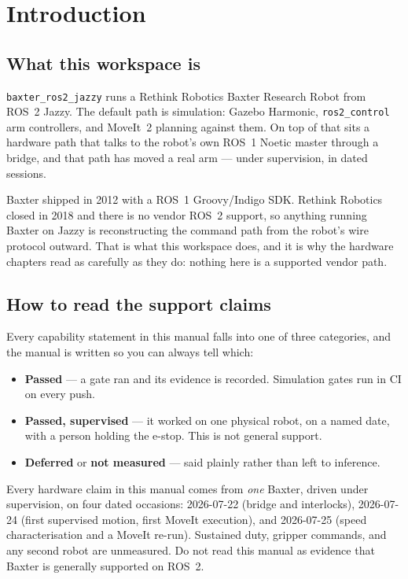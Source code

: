 \chapter{Introduction}
\label{ch:intro}

\section{What this workspace is}

\texttt{baxter\_ros2\_jazzy} runs a Rethink Robotics Baxter Research Robot from
ROS~2 Jazzy. The default path is simulation: Gazebo Harmonic, \texttt{ros2\_control}
arm controllers, and MoveIt~2 planning against them. On top of that sits a
hardware path that talks to the robot's own ROS~1 Noetic master through a bridge,
and that path has moved a real arm --- under supervision, in dated sessions.

Baxter shipped in 2012 with a ROS~1 Groovy/Indigo SDK. Rethink Robotics closed in
2018 and there is no vendor ROS~2 support, so anything running Baxter on Jazzy is
reconstructing the command path from the robot's wire protocol outward. That is
what this workspace does, and it is why the hardware chapters read as carefully as
they do: nothing here is a supported vendor path.

\section{How to read the support claims}

Every capability statement in this manual falls into one of three categories, and
the manual is written so you can always tell which:

\begin{itemize}
  \item \textbf{Passed} --- a gate ran and its evidence is recorded. Simulation
    gates run in CI on every push.
  \item \textbf{Passed, supervised} --- it worked on one physical robot, on a named
    date, with a person holding the e-stop. This is not general support.
  \item \textbf{Deferred} or \textbf{not measured} --- said plainly rather than
    left to inference.
\end{itemize}

\begin{safetybox}
Every hardware claim in this manual comes from \emph{one} Baxter, driven under
supervision, on four dated occasions: 2026-07-22 (bridge and interlocks),
2026-07-24 (first supervised motion, first MoveIt execution), and 2026-07-25
(speed characterisation and a MoveIt re-run). Sustained duty, gripper commands,
and any second robot are unmeasured. Do not read this manual as evidence that
Baxter is generally supported on ROS~2.
\end{safetybox}

